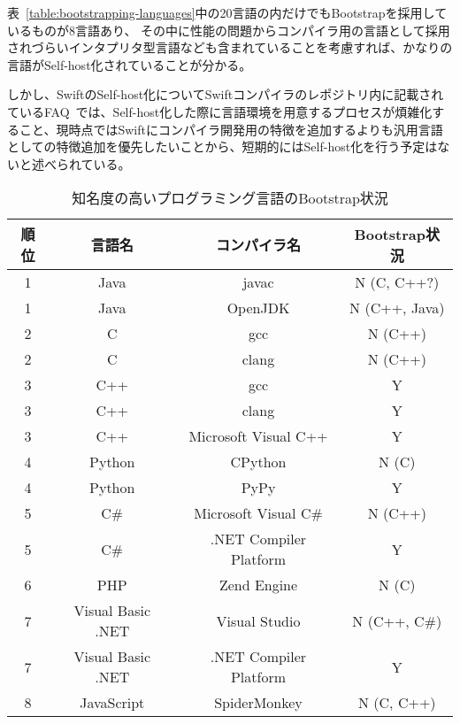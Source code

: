 表~\ref{table:bootstrapping-languages}中の20言語の内だけでもBootstrapを採用しているものが8言語あり、 その中に性能の問題からコンパイラ用の言語として採用されづらいインタプリタ型言語なども含まれていることを考慮すれば、かなりの言語がSelf-host化されていることが分かる。

しかし、SwiftのSelf-host化についてSwiftコンパイラのレポジトリ内に記載されているFAQ~\cite{swift-faq}では、Self-host化した際に言語環境を用意するプロセスが煩雑化すること、現時点ではSwiftにコンパイラ開発用の特徴を追加するよりも汎用言語としての特徴追加を優先したいことから、短期的にはSelf-host化を行う予定はないと述べられている。

\begin{table}[hb]
    \begin{center}
        \caption{知名度の高いプログラミング言語のBootstrap状況}
        \begin{tabular}{|c|c|c|c|}
            \hline
            順位 & 言語名 & コンパイラ名 & Bootstrap状況 \\
            \hline
            1 & Java & javac & N (C, C++?) \\
            \hline
            1 & Java & OpenJDK & N (C++, Java) \\
            \hline
            2 & C & gcc & N (C++) \\
            \hline
            2 & C & clang & N (C++) \\
            \hline
            3 & C++ & gcc & Y \\
            \hline
            3 & C++ & clang & Y \\
            \hline
            3 & C++ & Microsoft Visual C++ & Y \\
            \hline
            4 & Python & CPython & N (C) \\
            \hline
            4 & Python & PyPy & Y \\
            \hline
            5 & C\# & Microsoft Visual C\# & N (C++) \\
            \hline
            5 & C\# & .NET Compiler Platform & Y \\
            \hline
            6 & PHP & Zend Engine & N (C) \\
            \hline
            7 & Visual Basic .NET & Visual Studio & N (C++, C\#) \\
            \hline
            7 & Visual Basic .NET & .NET Compiler Platform & Y \\
            \hline
            8 & JavaScript & SpiderMonkey & N (C, C++) \\

\end{tabular}
\end{center}
\end{table}
